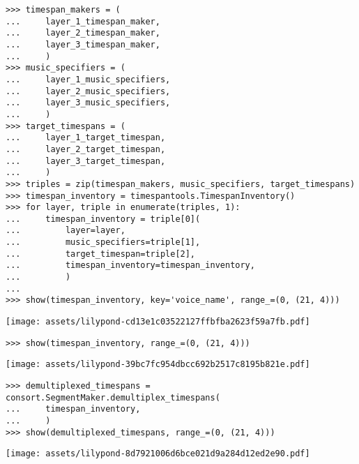 \begin{singlespacing}
\vspace{-0.5\baselineskip}
\begin{lstlisting}
>>> timespan_makers = (
...     layer_1_timespan_maker,
...     layer_2_timespan_maker,
...     layer_3_timespan_maker,
...     )
>>> music_specifiers = (
...     layer_1_music_specifiers,
...     layer_2_music_specifiers,
...     layer_3_music_specifiers,
...     )
>>> target_timespans = (
...     layer_1_target_timespan,
...     layer_2_target_timespan,
...     layer_3_target_timespan,
...     )
>>> triples = zip(timespan_makers, music_specifiers, target_timespans)
>>> timespan_inventory = timespantools.TimespanInventory()
>>> for layer, triple in enumerate(triples, 1):
...     timespan_inventory = triple[0](
...         layer=layer,
...         music_specifiers=triple[1],
...         target_timespan=triple[2],
...         timespan_inventory=timespan_inventory,
...         )
...
>>> show(timespan_inventory, key='voice_name', range_=(0, (21, 4)))
\end{lstlisting}
\noindent\texttt{[image: assets/lilypond-cd13e1c03522127ffbfba2623f59a7fb.pdf]}
\end{singlespacing}

\begin{comment}
<abjad>
show(timespan_inventory, range_=(0, (21, 4)))
</abjad>
\end{comment}

\begin{singlespacing}
\vspace{-0.5\baselineskip}
\begin{lstlisting}
>>> show(timespan_inventory, range_=(0, (21, 4)))
\end{lstlisting}
\noindent\texttt{[image: assets/lilypond-39bc7fc954dbcc692b2517c8195b821e.pdf]}
\end{singlespacing}

\begin{comment}
<abjad>
demultiplexed_timespans = consort.SegmentMaker.demultiplex_timespans(
    timespan_inventory,
    )
show(demultiplexed_timespans, range_=(0, (21, 4)))
</abjad>
\end{comment}

\begin{singlespacing}
\vspace{-0.5\baselineskip}
\begin{lstlisting}
>>> demultiplexed_timespans = consort.SegmentMaker.demultiplex_timespans(
...     timespan_inventory,
...     )
>>> show(demultiplexed_timespans, range_=(0, (21, 4)))
\end{lstlisting}
\noindent\texttt{[image: assets/lilypond-8d7921006d6bce021d9a284d12ed2e90.pdf]}
\end{singlespacing}

